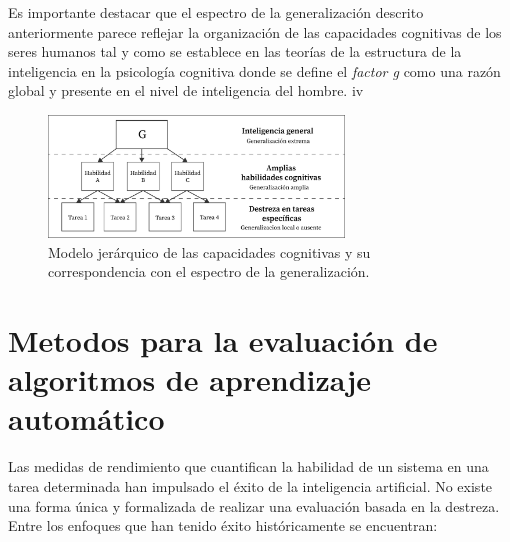 Es importante destacar que el espectro de la generalización descrito anteriormente parece reflejar la organización de las capacidades cognitivas de los seres humanos tal y como se establece en las teorías de la estructura de la inteligencia en la psicología cognitiva donde se define el \textit{factor g} como una razón global y presente en el nivel de inteligencia del hombre. 
iv

\begin{figure}[ht!]
    \centering
    \includegraphics[width=0.7\textwidth]{Graphics/g-factor.png}
    \caption{Modelo jerárquico de las capacidades cognitivas y su correspondencia con el espectro de la generalización.}
    \label{fig:g-factor}
\end{figure}

\section{Metodos para la evaluación de algoritmos de aprendizaje automático}\label{section:state-of-the-art:evaluating-algoritms}

Las medidas de rendimiento que cuantifican la habilidad de un sistema en una tarea determinada han impulsado el éxito de la inteligencia artificial. No existe una forma única y formalizada de realizar una evaluación basada en la destreza. Entre los enfoques que han tenido éxito históricamente se encuentran:

